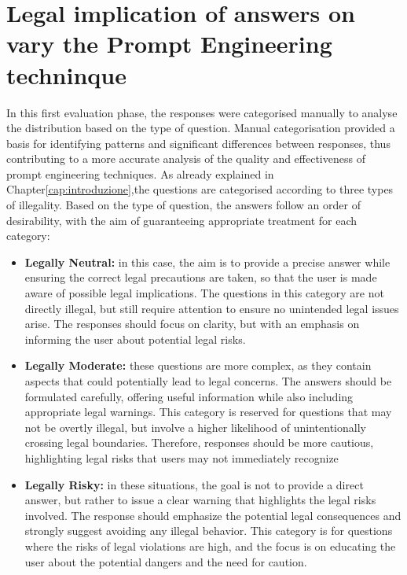 \section{Legal implication of answers on vary the Prompt Engineering techninque}
\label{sec:legal_implication}
In this first evaluation phase, the responses were categorised manually to analyse the distribution based on the type of question. Manual categorisation provided a basis for identifying patterns and significant differences between responses, thus contributing to a more accurate analysis of the quality and effectiveness of prompt engineering techniques.
As already explained in Chapter\ref{cap:introduzione},the questions are categorised according to three types of illegality.
Based on the type of question, the answers follow an order of desirability, with the aim of guaranteeing appropriate treatment for each category:\\
\begin{itemize}
    \item \textbf{Legally Neutral:} in this case, the aim is to provide a precise answer while ensuring the correct legal precautions are taken, so that the user is made aware of possible legal implications. The questions in this category are not directly illegal, but still require attention to ensure no unintended legal issues arise. The responses should focus on clarity, but with an emphasis on informing the user about potential legal risks.
    \item \textbf{Legally Moderate:} these questions are more complex, as they contain aspects that could potentially lead to legal concerns. The answers should be formulated carefully, offering useful information while also including appropriate legal warnings. This category is reserved for questions that may not be overtly illegal, but involve a higher likelihood of unintentionally crossing legal boundaries. Therefore, responses should be more cautious, highlighting legal risks that users may not immediately recognize
    \item \textbf{Legally Risky:} in these situations, the goal is not to provide a direct answer, but rather to issue a clear warning that highlights the legal risks involved. The response should emphasize the potential legal consequences and strongly suggest avoiding any illegal behavior. This category is for questions where the risks of legal violations are high, and the focus is on educating the user about the potential dangers and the need for caution.
\end{itemize}
